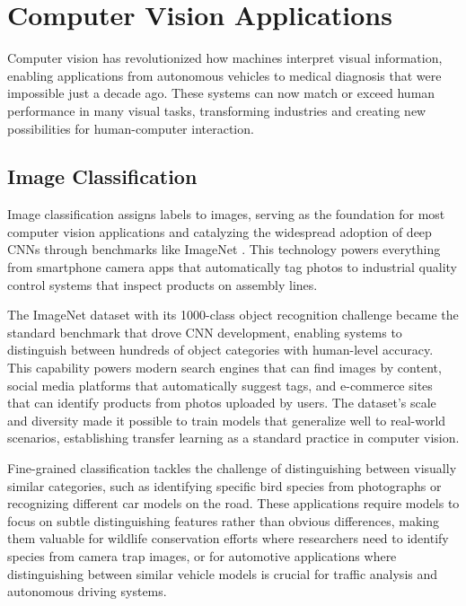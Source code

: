 
\section{Computer Vision Applications }
\label{sec:cv-applications}

Computer vision has revolutionized how machines interpret visual information, enabling applications from autonomous vehicles to medical diagnosis that were impossible just a decade ago. These systems can now match or exceed human performance in many visual tasks, transforming industries and creating new possibilities for human-computer interaction.

\subsection{Image Classification}

Image classification assigns labels to images, serving as the foundation for most computer vision applications and catalyzing the widespread adoption of deep CNNs through benchmarks like ImageNet  \textcite{Krizhevsky2012,He2016,GoodfellowEtAl2016,Prince2023}. This technology powers everything from smartphone camera apps that automatically tag photos to industrial quality control systems that inspect products on assembly lines.

The ImageNet dataset with its 1000-class object recognition challenge became the standard benchmark that drove CNN development, enabling systems to distinguish between hundreds of object categories with human-level accuracy. This capability powers modern search engines that can find images by content, social media platforms that automatically suggest tags, and e-commerce sites that can identify products from photos uploaded by users. The dataset's scale and diversity made it possible to train models that generalize well to real-world scenarios, establishing transfer learning as a standard practice in computer vision.

Fine-grained classification tackles the challenge of distinguishing between visually similar categories, such as identifying specific bird species from photographs or recognizing different car models on the road. These applications require models to focus on subtle distinguishing features rather than obvious differences, making them valuable for wildlife conservation efforts where researchers need to identify species from camera trap images, or for automotive applications where distinguishing between similar vehicle models is crucial for traffic analysis and autonomous driving systems.

